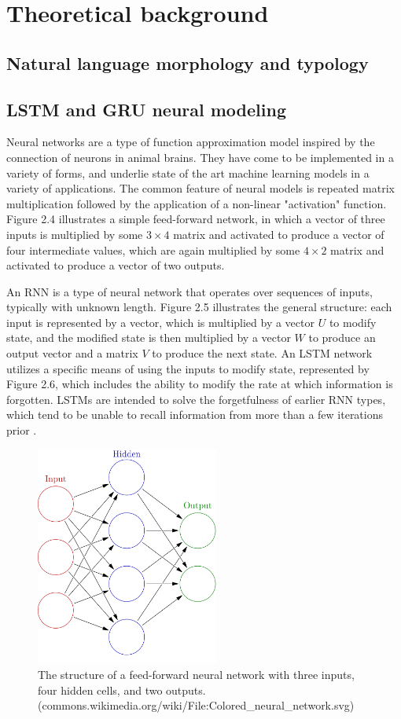 \chapter{Theoretical background}

\section{Natural language morphology and typology}

\section{LSTM and GRU neural modeling}

Neural networks are a type of function approximation model inspired by the connection of neurons in animal brains. They have come to be implemented in a variety of forms, and underlie state of the art machine learning models in a variety of applications. The common feature of neural models is repeated matrix multiplication followed by the application of a non-linear "activation" function. Figure 2.4 illustrates a simple feed-forward network, in which a vector of three inputs is multiplied by some $3 \times 4$ matrix and activated to produce a vector of four intermediate values, which are again multiplied by some $4 \times 2$ matrix and activated to produce a vector of two outputs.

An RNN is a type of neural network that operates over sequences of inputs, typically with unknown length. Figure 2.5 illustrates the general structure: each input is represented by a vector, which is multiplied by a vector $U$ to modify state, and the modified state is then multiplied by a vector $W$ to produce an output vector and a matrix $V$ to produce the next state. An LSTM network utilizes a specific means of using the inputs to modify state, represented by Figure 2.6, which includes the ability to modify the rate at which information is forgotten. LSTMs are intended to solve the forgetfulness of earlier RNN types, which tend to be unable to recall information from more than a few iterations prior \parencite{Hochreiter1997}.

\begin{figure}[ht]
\includegraphics[width=6cm]{images/1000px-Colored_neural_network.png}
\centering
\caption{The structure of a feed-forward neural network with three inputs, four hidden cells, and two outputs. (commons.wikimedia.org/wiki/File:Colored\_neural\_network.svg)}
\end{figure}

